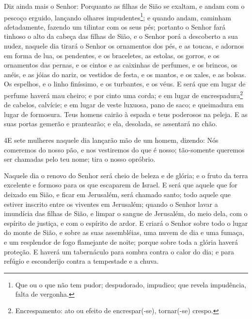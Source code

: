 Diz ainda mais o Senhor: Porquanto as filhas de Sião se exaltam,
e andam com o pescoço erguido, lançando olhares
impudentes\footnote{Que ou o que não tem pudor; despudorado,
impudico; que revela impudência, falta de vergonha.}; e quando
andam, caminham afetadamente, fazendo um tilintar com os seus pés;
portanto o Senhor fará tinhoso o alto da cabeça das filhas de
Sião, e o Senhor porá a descoberto a sua nudez, naquele dia
tirará o Senhor os ornamentos dos pés, e as toucas, e adornos em
forma de lua, os pendentes, e os braceletes, as estolas,
os gorros, e os ornamentos das pernas, e os cintos e as
caixinhas de perfumes, e os brincos, os anéis, e as jóias do
nariz, os vestidos de festa, e os mantos, e os xales, e as
bolsas. Os espelhos, e o linho finíssimo, e os turbantes, e
os véus. E será que em lugar de perfume haverá mau cheiro; e
por cinto uma corda; e em lugar de
encrespadura\footnote{Encrespamento: ato ou efeito de
encrespar(-se), tornar(-se) crespo.} de cabelos, calvície; e em
lugar de veste luxuosa, pano de saco; e queimadura em lugar de
formosura. Teus homens cairão à espada e teus poderosos na
peleja. E as suas portas gemerão e prantearão; e ela,
desolada, se assentará no chão.

\medskip

\lettrine{4}{}E sete mulheres naquele dia lançarão mão de um
homem, dizendo: Nós comeremos do nosso pão, e nos vestiremos do que
é nosso; tão-somente queremos ser chamadas pelo teu nome; tira o
nosso opróbrio.

Naquele dia o renovo do Senhor será cheio de beleza e de glória; e
o fruto da terra excelente e formoso para os que escaparem de
Israel. E será que aquele que for deixado em Sião, e ficar em
Jerusalém, será chamado santo; todo aquele que estiver inscrito
entre os viventes em Jerusalém; quando o Senhor lavar a
imundícia das filhas de Sião, e limpar o sangue de Jerusalém, do
meio dela, com o espírito de justiça, e com o espírito de ardor.
E criará o Senhor sobre todo o lugar do monte de Sião, e sobre
as suas assembléias, uma nuvem de dia e uma fumaça, e um resplendor
de fogo flamejante de noite; porque sobre toda a glória haverá
proteção. E haverá um tabernáculo para sombra contra o calor do
dia; e para refúgio e esconderijo contra a tempestade e a chuva.

\medskip

